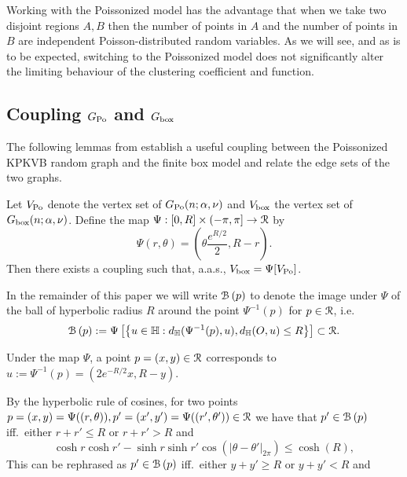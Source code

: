 Working with the Poissonized model has the advantage that when we take two disjoint regions $A, B$ then the number of points in $A$ and the number of points  in $B$ are independent Poisson-distributed random variables. As we will see, and as is to be expected, switching to the Poissonized model does not significantly alter the limiting behaviour of the clustering coefficient and function.


\subsection{Coupling $G_{{\mathrm{Po}}}$ and $G_{\mathrm{box}}$\label{ssec:coupling_H_P}}


The following lemmas from \cite{fountoulakis2018law} establish a useful coupling between the Poissonized KPKVB random graph
and the finite box model and relate the edge  sets of the two graphs. 

\begin{lemma}\label{lem:coupling_hyperbolic_poisson}
Let $V_{{\mathrm{Po}}}$ denote the vertex set of $G_{{\mathrm{Po}}}(n;\alpha, \nu)$ and $V_{\text{box}}$ the vertex set of $G_{\mathrm{box}}(n;\alpha, \nu)$. 
Define the map $\Psi : [0,R] \times (-\pi, \pi] \to {\mathcal R}$ by
\begin{equation}\label{eq:def_Psi}
	\Psi(r,\theta) = \left(\theta \frac{e^{R/2}}{2}, R - r\right).
\end{equation}
Then there exists a coupling such that, a.a.s., $V_{\text{box}} = \Psi[V_{{\mathrm{Po}}}]$. %
\end{lemma}

In the remainder of this paper we will write ${\mathcal B}\left(p\right)$ to denote the image under $\Psi$ of the ball of hyperbolic radius $R$ around the point 
$\Psi^{-1}(p)$ for $p \in {\mathcal R}$, i.e. 
\[
	{\mathcal B}\left(p\right) := 
	\Psi\left[ \left\{ u \in {\mathbb H} : 
	d_{\mathbb{H}}(\Psi^{-1}(p),u), d_{\mathbb{H}}(O,u) \le R \right\}\right] \subset {\mathcal R}.
\]

Under the map $\Psi$, a point $p = (x,y) \in {\mathcal R}$ corresponds to $u := \Psi^{-1}(p) = (2 e^{-R/2} x, R - y)$. 

By the hyperbolic rule of cosines, for two points $p = (x,y) = \Psi( (r,\theta) ), p' = (x',y') = \Psi( (r',\theta') ) \in {\mathcal R}$ we have that $p' \in {\mathcal B}\left(p\right)$ iff.~either $r+r'\leq R$ or $r+r'>R$ and
\[
	\cosh r \cosh r' - \sinh r \sinh r'\cos\left( |\theta-\theta'|_{2\pi} \right) \le \cosh(R),
\]
This can be rephrased as $p'\in {\mathcal B}\left(p\right)$ iff.~either $y+y'\geq R$ or $y+y'<R$ and 


